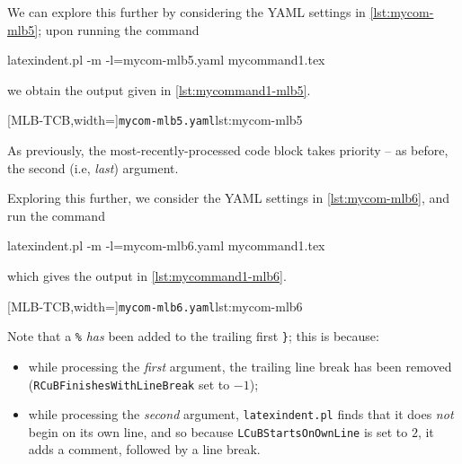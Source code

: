 \documentclass[10pt]{article}
\begin{document}
 \begin{example}
 We can explore this further by considering the YAML settings in \cref{lst:mycom-mlb5};
 upon running the command  

 \begin{commandshell}
latexindent.pl -m -l=mycom-mlb5.yaml mycommand1.tex
\end{commandshell}

 we obtain the output given in \cref{lst:mycommand1-mlb5}.

 \begin{cmhtcbraster}[raster column skip=.05\linewidth]
  [MLB-TCB,width=\linewidth]{\texttt{mycom-mlb5.yaml}}{lst:mycom-mlb5}
 \end{cmhtcbraster}

 As previously, the most-recently-processed code block takes priority -- as before, the
 second (i.e, \emph{last}) argument.

 Exploring this further, we consider the YAML settings in \cref{lst:mycom-mlb6}, and run
 the command

 \begin{commandshell}
latexindent.pl -m -l=mycom-mlb6.yaml mycommand1.tex
\end{commandshell}

 which gives the output in \cref{lst:mycommand1-mlb6}.

 \begin{cmhtcbraster}[raster column skip=.05\linewidth]
  [MLB-TCB,width=\linewidth]{\texttt{mycom-mlb6.yaml}}{lst:mycom-mlb6}
 \end{cmhtcbraster}

 Note that a \lstinline!%! \emph{has} been added to the trailing first \lstinline!}!;
 this is because:
 \begin{itemize}
  \item while processing the \emph{first} argument, the trailing line break has been
        removed (\texttt{RCuBFinishesWithLineBreak} set to $-1$);
  \item while processing the \emph{second} argument, \texttt{latexindent.pl} finds that
        it does \emph{not} begin on its own line, and so because
        \texttt{LCuBStartsOnOwnLine} is set to $2$, it adds a comment, followed by a line
        break.
 \end{itemize}
 \end{example}
\end{document}

